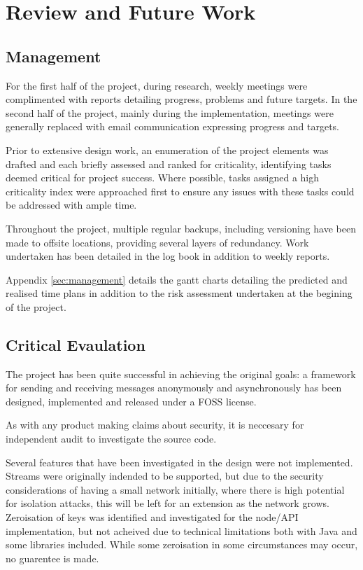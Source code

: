 \section{Review and Future Work}

	\subsection{Management}
		For the first half of the project, during research, weekly meetings were complimented with reports detailing progress, problems and future targets. In the second half of the project, mainly during the implementation, meetings were generally replaced with email communication expressing progress and targets.
		
		Prior to extensive design work, an enumeration of the project elements was drafted and each briefly assessed and ranked for criticality, identifying tasks deemed critical for project success. Where possible, tasks assigned a high criticality index were approached first to ensure any issues with these tasks could be addressed with ample time.
		
		Throughout the project, multiple regular backups, including versioning have been made to offsite locations, providing several layers of redundancy. Work undertaken has been detailed in the log book in addition to weekly reports.

		Appendix \ref{sec:management} details the gantt charts detailing the predicted and realised time plans in addition to the risk assessment undertaken at the begining of the project.

	\subsection{Critical Evaulation}
		The project has been quite successful in achieving the original goals: a framework for sending and receiving messages anonymously and asynchronously has been designed, implemented and released under a FOSS license. 
		
		As with any product making claims about security, it is neccesary for independent audit to investigate the source code. 
		
		Several features that have been investigated in the design were not implemented. Streams were originally indended to be supported, but due to the security considerations of having a small network initially, where there is high potential for isolation attacks, this will be left for an extension as the network grows. Zeroisation of keys was identified and investigated for the node/API implementation, but not acheived due to technical limitations both with Java and some libraries included. While some zeroisation in some circumstances may occur, no guarentee is made.
		
